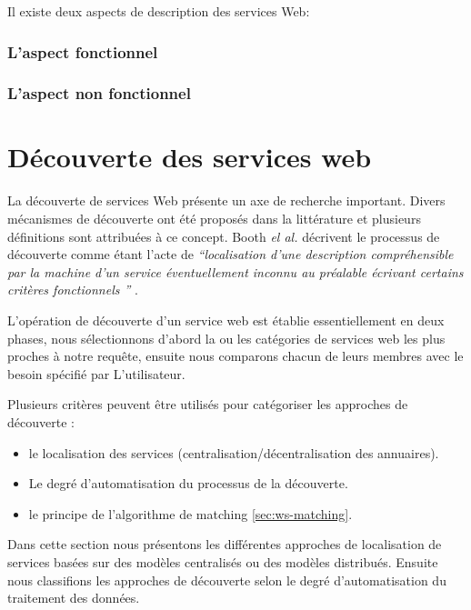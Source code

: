   Il existe deux aspects de description des services Web:

    \subsubsection{L'aspect fonctionnel}
    \label{sec:aspect-fonctionnel}

    \subsubsection{L'aspect non fonctionnel}
    \label{sec:aspect-non-fonctionel}

\newpage
\section{Découverte des services web}
\label{sec:ws-discovery}
La découverte de services Web présente un axe de recherche
important. Divers mécanismes de découverte ont été proposés dans la
littérature et plusieurs définitions sont attribuées à ce
concept. Booth \textit{el al.}  décrivent le processus de découverte
comme étant l'acte de \textit{``localisation d'une description
  compréhensible par la machine d'un service éventuellement inconnu au
  préalable écrivant certains critères fonctionnels ''}
\cite{booth2004web}.

L'opération de découverte d'un service web est établie essentiellement
en deux phases, nous sélectionnons d'abord la ou les catégories de
services web les plus proches à notre requête, ensuite nous comparons
chacun de leurs membres avec le besoin spécifié par L'utilisateur.

Plusieurs critères peuvent être utilisés pour catégoriser les
approches de découverte \cite{elie2010}:

\begin{itemize}
\item le localisation des services (centralisation/décentralisation
  des annuaires).
\item Le degré d'automatisation du processus de la découverte.
\item le principe de l'algorithme de matching \ref{sec:ws-matching}.
\end{itemize}


{\color{red} %
  Dans cette section nous présentons les différentes approches de
  localisation de services basées sur des modèles centralisés ou des
  modèles distribués. Ensuite nous classifions les approches de
  découverte selon le degré d'automatisation du traitement des
  données. \cite{elie2010}
}

